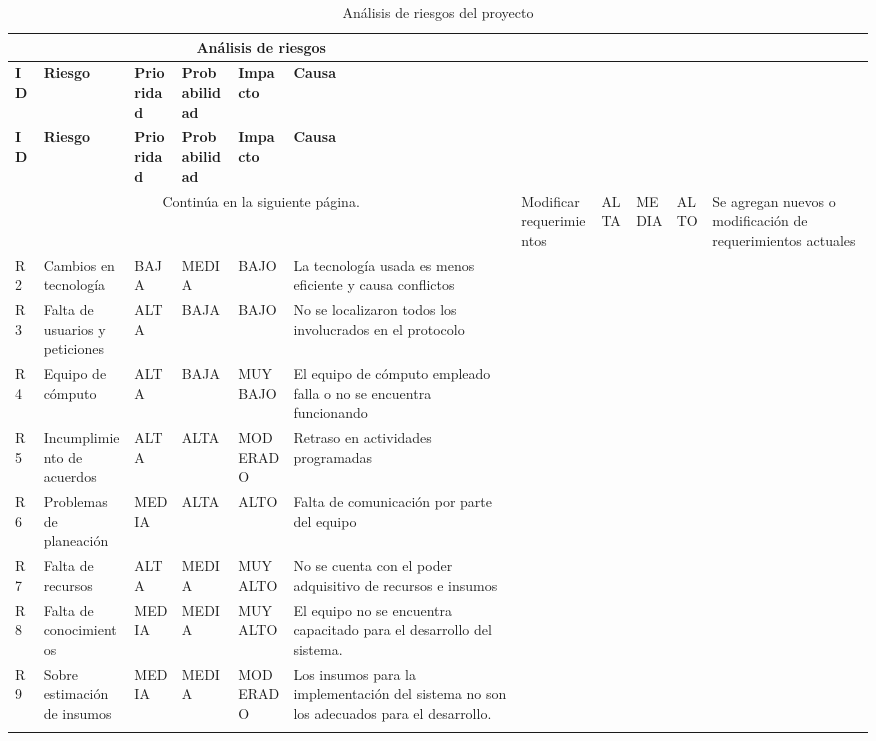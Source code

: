 \begin{longtable}{| p{1cm} | p{4cm} | p{2cm} | p{2.5cm} | p{2cm} | p{3.5cm} |}

\hline
\multicolumn{6}{|c|}{\textbf{Análisis de riesgos}} \\ \hline
\textbf{ID} & \textbf{Riesgo} & \textbf{Prioridad} & \textbf{Probabilidad} & \textbf{Impacto} & \textbf{Causa}\\
\hline \hline
\endfirsthead

\hline
\textbf{ID} & \textbf{Riesgo} & \textbf{Prioridad} & \textbf{Probabilidad} & \textbf{Impacto} & \textbf{Causa}\\
\hline \hline
\endhead

\multicolumn{6}{|c|}{Continúa en la siguiente página.}
\endfoot

\endlastfoot

R1 & Modificar requerimientos & ALTA & MEDIA & ALTO & Se agregan nuevos o modificación de requerimientos actuales \\ \hline
R2 & Cambios en tecnología & BAJA & MEDIA & BAJO & La tecnología usada es menos eficiente y causa conflictos \\ \hline
R3 & Falta de usuarios y peticiones & ALTA & BAJA & BAJO & No se localizaron todos los involucrados en el protocolo \\ \hline
R4 & Equipo de cómputo & ALTA & BAJA & MUY BAJO & El equipo de cómputo empleado falla o no se encuentra funcionando \\ \hline
R5 & Incumplimiento de acuerdos & ALTA & ALTA & MODERADO & Retraso en actividades programadas \\ \hline
R6 & Problemas de planeación & MEDIA & ALTA & ALTO & Falta de comunicación por parte del equipo \\ \hline
R7 & Falta de recursos & ALTA & MEDIA & MUY ALTO & No se cuenta con el poder adquisitivo de recursos e insumos \\ \hline
R8 & Falta de conocimientos & MEDIA & MEDIA & MUY ALTO & El equipo no se encuentra capacitado para el desarrollo del sistema. \\ \hline
R9 & Sobre estimación de insumos & MEDIA & MEDIA & MODERADO & Los insumos para la implementación del sistema no son los adecuados para el desarrollo. 

\\ \hline
\caption{Análisis de riesgos del proyecto}
\label{Análisis de riesgos }
\end{longtable}


